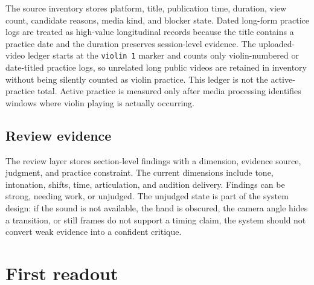 \documentclass[12pt,letterpaper]{article}
\begin{document}
The source inventory stores platform, title, publication time, duration, view count, candidate reasons, media kind, and blocker state. Dated long-form practice logs are treated as high-value longitudinal records because the title contains a practice date and the duration preserves session-level evidence. The uploaded-video ledger starts at the \texttt{violin 1} marker and counts only violin-numbered or date-titled practice logs, so unrelated long public videos are retained in inventory without being silently counted as violin practice. This ledger is not the active-practice total. Active practice is measured only after media processing identifies windows where violin playing is actually occurring.

\subsection{Review evidence}

The review layer stores section-level findings with a dimension, evidence source, judgment, and practice constraint. The current dimensions include tone, intonation, shifts, time, articulation, and audition delivery. Findings can be strong, needing work, or unjudged. The unjudged state is part of the system design: if the sound is not available, the hand is obscured, the camera angle hides a transition, or still frames do not support a timing claim, the system should not convert weak evidence into a confident critique.

\section{First readout}
\end{document}
